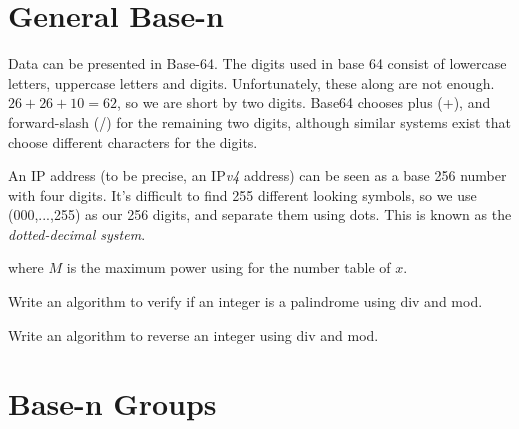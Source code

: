 \section{General Base-n}



\frmrule 

\begin{example}
Data can be presented in Base-64. The digits used in base 64 consist of lowercase letters, 
uppercase letters and digits. Unfortunately, these along are not enough.
$26 + 26 + 10 = 62$, so we are short by two digits. Base64 chooses plus (+), 
and forward-slash (/) for the remaining two digits, although similar systems 
exist that choose different characters for the digits.
\end{example}


\frmrule 

\begin{example}
An IP address (to be precise, an IP\textit{v4} address) can be seen as a 
base 256 number with four digits. It's difficult to find 
255 different looking symbols, so we use (000,...,255) as our 256 digits, 
and separate them using dots. This is known 
as the \textit{dotted-decimal system}.
\end{example}




where $M$ is the maximum power using for the number table of $x$.







\begin{example}
Write an algorithm to verify if an integer is a palindrome using div and mod.
\end{example}

\begin{example}
Write an algorithm to reverse an integer using div and mod.
\end{example}


\section{Base-n Groups}

